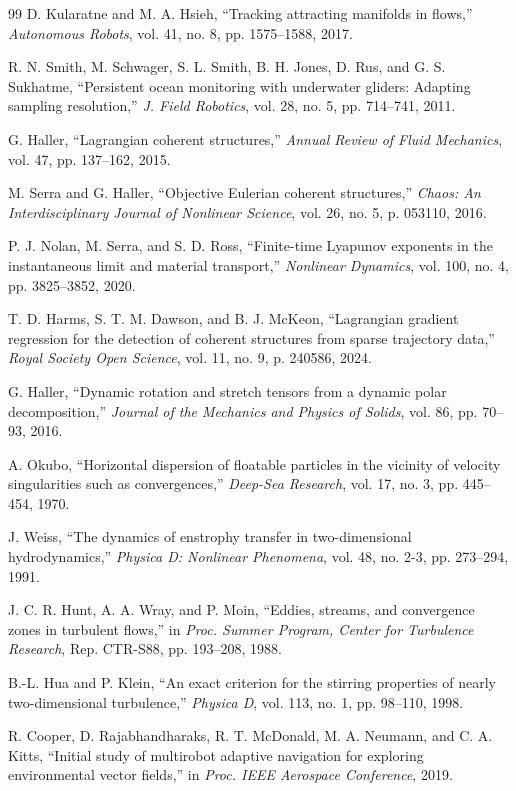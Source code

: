 \documentclass[lettersize,journal]{IEEEtran}
\begin{document}
\begin{thebibliography}{99}
 D. Kularatne and M. A. Hsieh, ``Tracking attracting manifolds in
flows,'' \textit{Autonomous Robots}, vol. 41, no. 8, pp. 1575--1588, 2017.

 R. N. Smith, M. Schwager, S. L. Smith, B. H. Jones, D. Rus,
and G. S. Sukhatme, ``Persistent ocean monitoring with underwater gliders:
Adapting sampling resolution,'' \textit{J. Field Robotics}, vol. 28, no. 5,
pp. 714--741, 2011.

 G. Haller, ``Lagrangian coherent structures,'' \textit{Annual
Review of Fluid Mechanics}, vol. 47, pp. 137--162, 2015.

 M. Serra and G. Haller, ``Objective Eulerian coherent
structures,'' \textit{Chaos: An Interdisciplinary Journal of Nonlinear
Science}, vol. 26, no. 5, p. 053110, 2016.

 P. J. Nolan, M. Serra, and S. D. Ross, ``Finite-time Lyapunov
exponents in the instantaneous limit and material transport,''
\textit{Nonlinear Dynamics}, vol. 100, no. 4, pp. 3825--3852, 2020.

 T. D. Harms, S. T. M. Dawson, and B. J. McKeon, ``Lagrangian
gradient regression for the detection of coherent structures from sparse
trajectory data,'' \textit{Royal Society Open Science}, vol. 11, no. 9,
p. 240586, 2024.

 G. Haller, ``Dynamic rotation and stretch tensors from a
dynamic polar decomposition,'' \textit{Journal of the Mechanics and Physics
of Solids}, vol. 86, pp. 70--93, 2016.

 A. Okubo, ``Horizontal dispersion of floatable particles in the
vicinity of velocity singularities such as convergences,'' \textit{Deep-Sea
Research}, vol. 17, no. 3, pp. 445--454, 1970.

 J. Weiss, ``The dynamics of enstrophy transfer in two-dimensional
hydrodynamics,'' \textit{Physica D: Nonlinear Phenomena}, vol. 48, no. 2-3,
pp. 273--294, 1991.

 J. C. R. Hunt, A. A. Wray, and P. Moin, ``Eddies, streams, and
convergence zones in turbulent flows,'' in \textit{Proc. Summer Program,
Center for Turbulence Research}, Rep. CTR-S88, pp. 193--208, 1988.

 B.-L. Hua and P. Klein, ``An exact criterion for the stirring
properties of nearly two-dimensional turbulence,'' \textit{Physica D}, vol. 113,
no. 1, pp. 98--110, 1998.

 R. Cooper, D. Rajabhandharaks, R. T. McDonald, M. A. Neumann,
and C. A. Kitts, ``Initial study of multirobot adaptive
navigation for exploring environmental vector fields,'' in \textit{Proc.
IEEE Aerospace Conference}, 2019.


\end{thebibliography}
\end{document}
